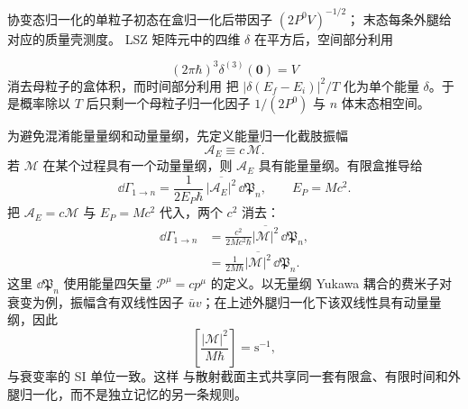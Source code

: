 \begin{derivation}
协变态归一化的单粒子初态在盒归一化后带因子 $(2P^0V)^{-1/2}$； 末态每条外腿给对应的质量壳测度。 LSZ 矩阵元中的四维 $\delta$ 在平方后，空间部分利用

\begin{equation*}
 (2\pi\hbar)^3\delta^{(3)}(\mathbf0)=V
\end{equation*}
消去母粒子的盒体积，而时间部分利用  把 $|\delta(E_f-E_i)|^2/T$ 化为单个能量 $\delta$。于是概率除以 $T$ 后只剩一个母粒子归一化因子 $1/(2P^0)$ 与 $n$ 体末态相空间。

为避免混淆能量量纲和动量量纲，先定义能量归一化截肢振幅
\begin{equation*}
 \mathcal A_E\equiv c\,\mathcal M.
\end{equation*}
若 $\mathcal M$ 在某个过程具有一个动量量纲，则 $\mathcal A_E$ 具有能量量纲。有限盒推导给
\begin{equation*}
 \dd\Gamma_{1\to n}
 =\frac{1}{2E_P\hbar}\,
 \overline{|\mathcal A_E|^2}\,\dd\mathfrak P_n,
 \qquad E_P=Mc^2.
 \end{equation*}
把 $\mathcal A_E=c\mathcal M$ 与 $E_P=Mc^2$ 代入，两个 $c^2$ 消去：
\begin{align*}
 \dd\Gamma_{1\to n}
 &=\frac{c^2}{2Mc^2\hbar}
 \overline{|\mathcal M|^2}\,\dd\mathfrak P_n,\\
 &={
 \frac{1}{2M\hbar}
 \overline{|\mathcal M|^2}\,\dd\mathfrak P_n.}
 \end{align*}
这里 $\dd\mathfrak P_n$ 使用能量四矢量 $\mathcal P^\mu=cp^\mu$ 的定义。以无量纲 Yukawa 耦合的费米子对衰变为例，振幅含有双线性因子 $\bar u v$；在上述外腿归一化下该双线性具有动量量纲，因此
\begin{equation*}
 \left[\frac{|\mathcal M|^2}{M\hbar}\right]
 =\mathrm{s^{-1}},
\end{equation*}
与衰变率的 SI 单位一致。这样  与散射截面主式共享同一套有限盒、有限时间和外腿归一化，而不是独立记忆的另一条规则。
\end{derivation}



